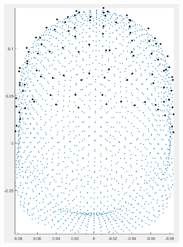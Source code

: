 \documentclass{beamer}
\numberwithin{figure}{section}
\numberwithin{equation}{section}
\begin{document}
\begin{frame}
\begin{figure}[h]
\begin{subfigure}[h]{0.33\linewidth}
            \includegraphics[width=\linewidth]{pictures/opmsen}
            \label{fig:rdfs_graph}
        \end{subfigure}
    \end{figure}
    
\end{frame}

\end{document}
